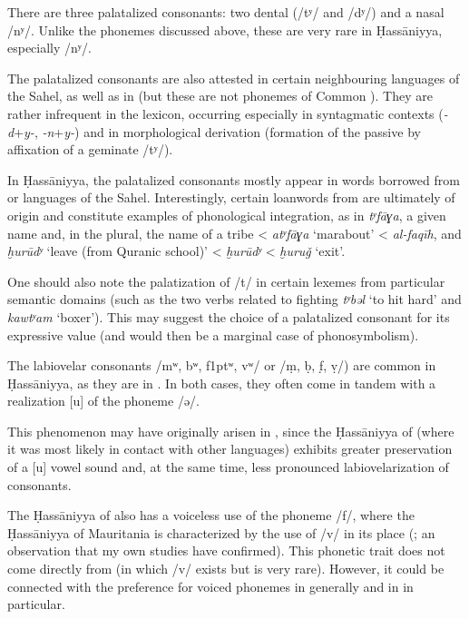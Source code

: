\documentclass[output=paper]{langsci/langscibook}
\begin{document}
There are three palatalized consonants: two dental (/tʸ/ and /dʸ/) and a nasal /nʸ/. Unlike the phonemes discussed above, these are very rare in Ḥassāniyya, especially /nʸ/.

The palatalized consonants are also attested in certain neighbouring languages of the Sahel, as well as in  (but these are not phonemes of Common ). They are rather infrequent in the  lexicon, occurring especially in syntagmatic contexts (\textit{{}-d}+\textit{y-}, \textit{{}-n}+\textit{y-}) and in morphological {derivation} ({formation} of the {passive} by affixation of a geminate /tʸ/).

In Ḥassāniyya, the palatalized consonants mostly appear in words borrowed from  or languages of the Sahel. Interestingly, certain {loanwords} from  are ultimately of  origin and constitute examples of phonological integration, as in \textit{tʸfāɣa}, a given name and, in the plural, the name of a tribe <  \textit{atʸfāɣa} ‘marabout’ <  \textit{al-faqīh}, and \textit{ḫurūdʸ} ‘leave (from Quranic school)’ <  \textit{ḫurūdʸ} <  \textit{ḫuruǧ} ‘exit’.

One should also note the palatization of /t/ in certain lexemes from particular semantic domains (such as the two verbs related to fighting \textit{tʸbəl} ‘to hit hard’ and \textit{kawtʸam} ‘boxer’). This may suggest the choice of a palatalized consonant for its expressive value (and would then be a marginal case of phonosymbolism).

The labiovelar consonants /mʷ, bʷ, f\kern 1ptʷ, vʷ/ or /ṃ, ḅ, f̣, ṿ/) are common in Ḥassāniyya, as they are in . In both cases, they often come in tandem with a realization [u] of the {phoneme} /ə/. 

This phenomenon may have originally arisen in , since the Ḥassāniyya of  (where it was most likely in contact with other languages) exhibits greater preservation of a [u] vowel sound and, at the same time, less pronounced labiovelarization of consonants. 

The Ḥassāniyya of  also has a voiceless use of the {phoneme} /f/, where the Ḥassāniyya of Mauritania is characterized by the use of /v/ in its place (\citealt{Heath2004}; an observation that my own studies have confirmed). This phonetic trait does not come directly from  (in which /v/ exists but is very rare). However, it could be connected with the preference for voiced phonemes in  generally and in  in particular.
\end{document}
